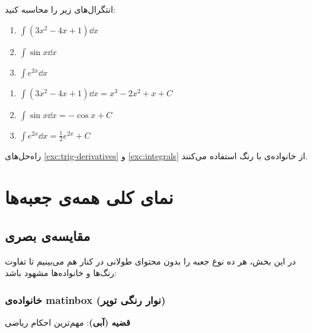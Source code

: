 \documentclass{matinbook}
\begin{document}
\begin{exercise}
    انتگرال‌های زیر را محاسبه کنید:
    \begin{enumerate}
        \item $\int (3x^{2} - 4x + 1) \dd{x}$
        \item $\int \sin x \dd{x}$
        \item $\int e^{2x} \dd{x}$
    \end{enumerate}
    \label{exc:integrals}
\end{exercise}

\begin{solution}[راه‌حل]
    \begin{enumerate}
        \item $\int (3x^{2} - 4x + 1) \dd{x}
        = x^{3} - 2x^{2} + x + C$
        \item $\int \sin x \dd{x} = -\cos x + C$
        \item $\int e^{2x} \dd{x}
        = \frac{1}{2}e^{2x} + C$
    \end{enumerate}
\end{solution}

راه‌حل‌های \cref{exc:trig-derivatives} و
\cref{exc:integrals} از خانواده‌ی 
با رنگ  استفاده می‌کنند.

\chapter{نمای کلی همه‌ی جعبه‌ها}
\label{chap:all-boxes}

\section{مقایسه‌ی بصری}
\label{sec:all-boxes-comparison}

در این بخش، هر ده نوع جعبه را بدون محتوای طولانی در
کنار هم می‌بینیم تا تفاوت رنگ‌ها و خانواده‌ها مشهود باشد:

\subsection*{خانواده‌ی matinbox (نوار رنگی توپر)}

\begin{theorem}
    \textbf{قضیه (آبی)}: مهم‌ترین احکام ریاضی
\end{theorem}
\end{document}
